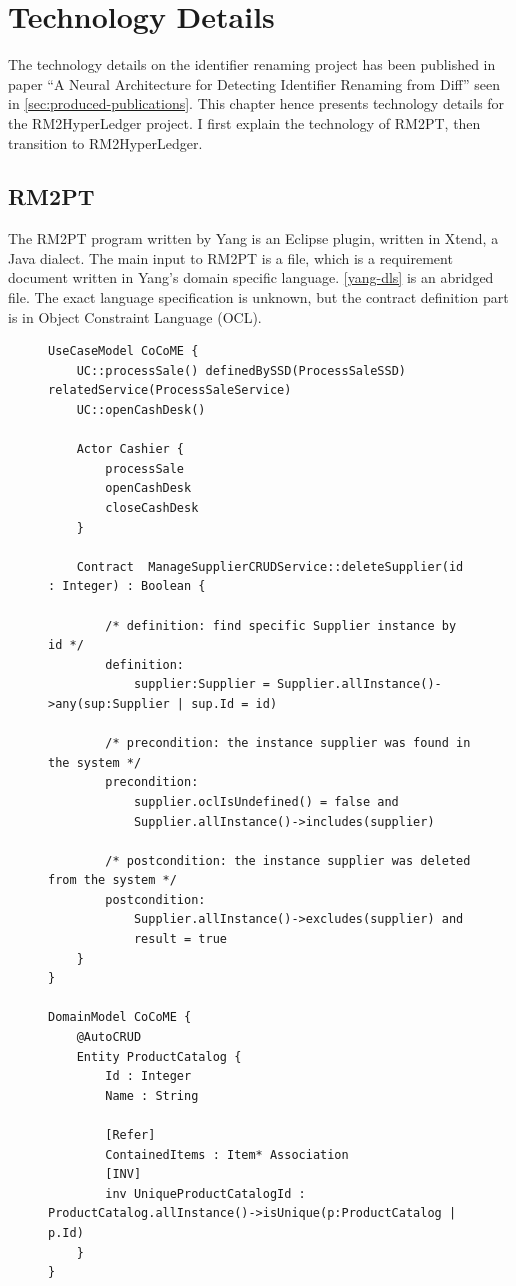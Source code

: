 \chapter{Technology Details}

The technology details on the identifier renaming project has been published in paper ``A Neural Architecture for Detecting Identifier Renaming from Diff'' seen in \autoref{sec:produced-publications}.
This chapter hence presents technology details for the RM2HyperLedger project. I first explain the technology of RM2PT, then transition to RM2HyperLedger.

\section{RM2PT}

The RM2PT program written by Yang is an Eclipse plugin, written in Xtend, a Java dialect. The main input to RM2PT is a  file, which is a requirement document written in Yang's  domain specific language. \autoref{yang-dls} is an abridged  file. The exact language specification is unknown, but the contract definition part is in Object Constraint Language (OCL).

\begin{figure}[ht]
\begin{lstlisting}[language={}, breaklines=true, showstringspaces=false, frame=tb, caption={an abridged \code{.remodel} file. The contract definition part is written in OCL.}, label=yang-dls]
UseCaseModel CoCoME {
	UC::processSale() definedBySSD(ProcessSaleSSD) relatedService(ProcessSaleService)
	UC::openCashDesk()

	Actor Cashier {
		processSale
		openCashDesk
		closeCashDesk
	}

	Contract  ManageSupplierCRUDService::deleteSupplier(id : Integer) : Boolean {

		/* definition: find specific Supplier instance by id */
		definition:
			supplier:Supplier = Supplier.allInstance()->any(sup:Supplier | sup.Id = id)

		/* precondition: the instance supplier was found in the system */
		precondition:
			supplier.oclIsUndefined() = false and
			Supplier.allInstance()->includes(supplier)

		/* postcondition: the instance supplier was deleted from the system */
		postcondition:
			Supplier.allInstance()->excludes(supplier) and
			result = true
	}
}

DomainModel CoCoME {
	@AutoCRUD
	Entity ProductCatalog {
		Id : Integer
		Name : String

		[Refer]
		ContainedItems : Item* Association
		[INV]
		inv UniqueProductCatalogId : ProductCatalog.allInstance()->isUnique(p:ProductCatalog | p.Id)
	}
}
\end{lstlisting}
\end{figure}


